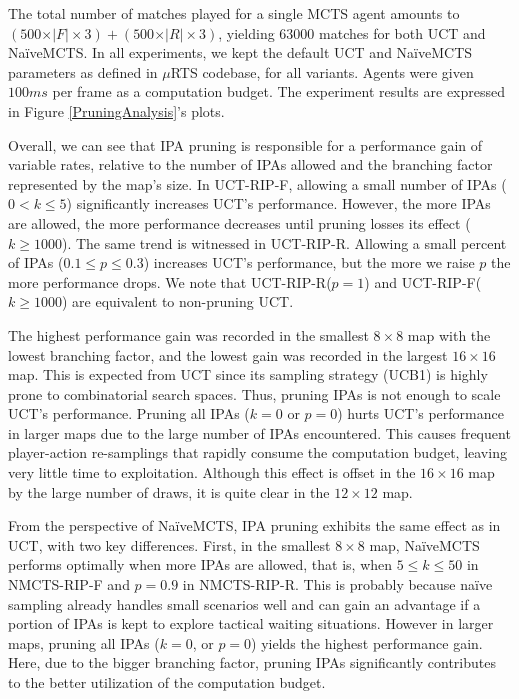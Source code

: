 \documentclass[conference]{IEEEtran}
\newcommand{\mRTS}{$\mu$RTS}
\begin{document}
The total number of matches played for a single MCTS agent amounts to $(500\times\vert F\vert\times3) + (500\times\vert R\vert\times3)$, yielding $63000$ matches for both UCT and NaïveMCTS. In all experiments, we kept the default UCT and NaïveMCTS parameters as defined in \mRTS{} codebase, for all variants. Agents were given $100ms$ per frame as a computation budget. The experiment results are expressed in Figure \ref{PruningAnalysis}'s plots.

Overall, we can see that IPA pruning is responsible for a performance gain of variable rates, relative to the number of IPAs allowed and the branching factor represented by the map's size. In UCT-RIP-F, allowing a small number of IPAs ($0 < k \leq 5$) significantly increases UCT's performance. However, the more IPAs are allowed, the more performance decreases until pruning losses its effect ($k \geq 1000$). The same trend is witnessed in UCT-RIP-R. Allowing a small percent of IPAs ($0.1 \leq p \leq 0.3$) increases UCT's performance, but the more we raise $p$ the more performance drops. We note that UCT-RIP-R($p=1$) and UCT-RIP-F($k \geq 1000$) are equivalent to non-pruning UCT.

The highest performance gain was recorded in the smallest $8\times8$ map with the lowest branching factor, and the lowest gain was recorded in the largest $16\times16$ map. This is expected from UCT since its sampling strategy (UCB1) is highly prone to combinatorial search spaces. Thus, pruning IPAs is not enough to scale UCT's performance. Pruning all IPAs ($k = 0$ or $p = 0$) hurts UCT's performance in larger maps due to the large number of IPAs encountered. This causes frequent player-action re-samplings that rapidly consume the computation budget, leaving very little time to exploitation. Although this effect is offset in the $16\times16$ map by the large number of draws, it is quite clear in the $12\times12$ map.

From the perspective of NaïveMCTS, IPA pruning exhibits the same effect as in UCT, with two key differences. First, in the smallest $8\times8$ map, NaïveMCTS performs optimally when more IPAs are allowed, that is, when $5 \leq k \leq 50$ in NMCTS-RIP-F and $p=0.9$ in NMCTS-RIP-R. This is probably because naïve sampling already handles small scenarios well and can gain an advantage if a portion of IPAs is kept to explore tactical waiting situations. However in larger maps, pruning all IPAs ($k = 0$, or $p = 0$) yields the highest performance gain. Here, due to the bigger branching factor, pruning IPAs significantly contributes to the better utilization of the computation budget.
\end{document}
